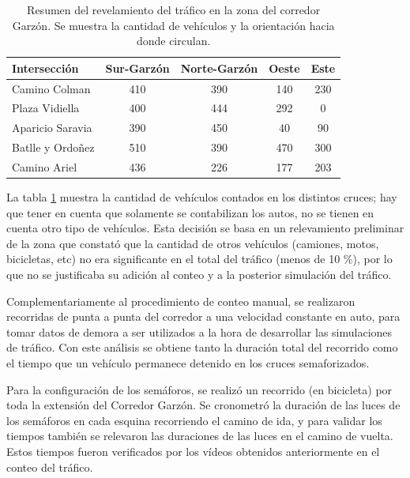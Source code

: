 \begin{table}[ht]
	\renewcommand{\arraystretch}{1.2}
	\caption[Resumen del revelamiento del tráfico en la zona del corredor Garzón.]{Resumen del revelamiento del tráfico en la zona del corredor Garzón. Se muestra la cantidad de vehículos y la orientación hacia donde circulan.}
	\label{table:resumen_trafico}
	\centering
	\begin{tabular}{lcccc}
		\hline
		Intersección&
		Sur-Garzón& 
		Norte-Garzón & 
		Oeste &
		Este 
		\\ 
		\hline
		Camino Colman  & 410 & 390 & 140 & 230\\		
		Plaza Vidiella  & 400 & 444 & 292 & 0\\		
		Aparicio Saravia  & 390 & 450 & 40 & 90\\		
		Batlle y Ordoñez  & 510 & 390 & 470 & 300 \\	
		Camino Ariel  & 436 & 226 & 177 & 203 \\													
		\hline
		
		
		\hline
	\end{tabular}
\end{table}

La tabla \ref{table:resumen_trafico} muestra la cantidad de vehículos contados en los distintos cruces; hay que tener en cuenta que solamente se contabilizan los autos, no se tienen en cuenta otro tipo de vehículos. Esta decisión se basa en un relevamiento preliminar de la zona que constató que la cantidad de otros vehículos (camiones, motos, bicicletas, etc) no era significante en el total del tráfico (menos de 10 \%), por lo que no se justificaba su adición al conteo y a la posterior simulación del tráfico.

Complementariamente al procedimiento de conteo manual, se realizaron recorridas de punta a punta del corredor a una velocidad constante en auto, para tomar datos de demora a ser utilizados a la hora de desarrollar las simulaciones de tráfico. Con este análisis se obtiene tanto la duración total del recorrido como el tiempo que un vehículo permanece detenido en los cruces semaforizados. 

Para la configuración de los semáforos, se realizó un recorrido (en bicicleta) por toda la extensión del Corredor Garzón. Se cronometró la duración de las luces de los semáforos en cada esquina recorriendo el camino de ida, y para validar los tiempos también se relevaron las duraciones de las luces en el camino de vuelta. Estos tiempos fueron verificados por los vídeos obtenidos anteriormente en el conteo del tráfico.


